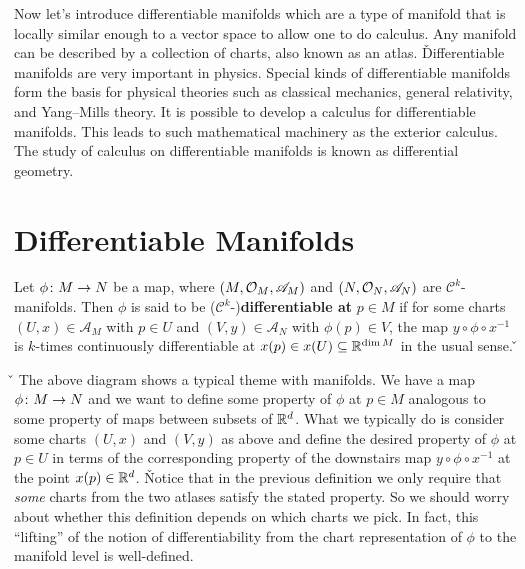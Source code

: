 Now let's introduce differentiable manifolds which are a type of manifold that is locally similar enough to a vector
space to allow one to do calculus. Any manifold can be described by a collection of charts, also known as an atlas. \v

Differentiable manifolds are very important in physics. Special kinds of differentiable manifolds form the basis for
physical theories such as classical mechanics, general relativity, and Yang–Mills theory. It is possible to develop a
calculus for differentiable manifolds. This leads to such mathematical machinery as the exterior calculus. The study
of calculus on differentiable manifolds is known as differential geometry.

\section{Differentiable Manifolds}

Let $\phi\colon M\to N$ be a map, where $(M,\mathcal{O}_M,\mathscr{A}_M)$ and $(N,\mathcal{O}_N,\mathscr{A}_N)$ are
$\mathcal{C}^k$-manifolds. Then $\phi$ is said to be ($\mathcal{C}^k$-)\textbf{differentiable at} $p\in M$ if for
some charts $(U,x)\in\mathscr{A}_M$ with $p\in U$ and $(V,y)\in\mathscr{A}_N$ with $\phi(p)\in V$, the map
$y\circ\phi\circ x^{-1}$ is $k$-times continuously differentiable at $x(p)\in x(U)\subseteq\mathbb{R}^{\dim M}$ in the usual sense. \v
\bse
{}
\ese

\v

\ed
The above diagram shows a typical theme with manifolds. We have a map $\phi\colon M\to N$ and we want to define some
property of $\phi$ at $p\in M$ analogous to some property of maps between subsets of $\mathbb{R}^d$. What we typically do is
consider some charts $(U,x)$ and $(V,y)$ as above and define the desired property of $\phi$ at $p\in U$ in terms of
the corresponding property of the downstairs map $y\circ\phi\circ x^{-1}$ at the point $x(p)\in\mathbb{R}^d$. \v

Notice that in the previous definition we only require that \emph{some} charts from the two atlases satisfy the
stated property. So we should worry about whether this definition depends on which charts we pick. In fact, this
``lifting'' of the notion of differentiability from the chart representation of $\phi$ to the manifold level is
well-defined.

